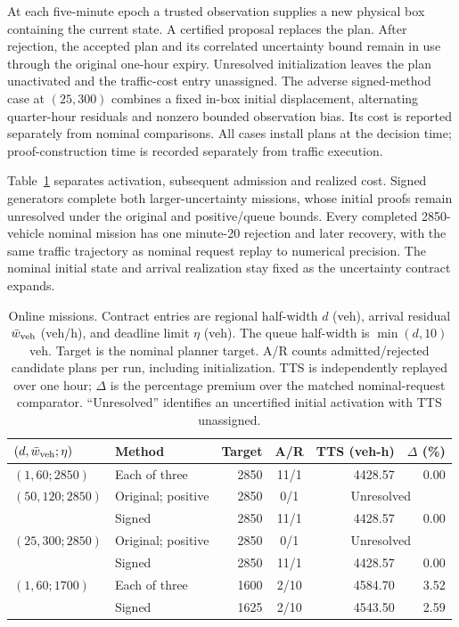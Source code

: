 \documentclass[journal,10pt]{IEEEtran}
\begin{document}
At each five-minute epoch a trusted observation supplies a new physical
box containing the current state. A certified proposal replaces the plan.
After rejection, the accepted plan
and its correlated uncertainty bound remain in use through the original
one-hour expiry. Unresolved initialization leaves the plan unactivated and
the traffic-cost entry unassigned. The adverse signed-method case at
$(25,300)$ combines a fixed in-box initial displacement, alternating
quarter-hour residuals and nonzero bounded observation bias. Its cost is
reported separately from nominal comparisons. All cases install plans at
the decision time; proof-construction time is
recorded separately from traffic execution.

Table~\ref{tab:structure-online} separates activation, subsequent admission
and realized cost. Signed generators complete both larger-uncertainty
missions, whose initial proofs remain unresolved under the original and
positive/queue bounds. Every completed 2850-vehicle nominal mission has
one minute-20 rejection and later recovery, with the same traffic trajectory
as nominal request replay to numerical precision. The nominal initial state
and arrival realization stay fixed as the
uncertainty contract expands.

\begin{table}[t]
\centering
\caption{Online missions. Contract entries are regional half-width $d$
(veh), arrival residual $\bar w_{\rm veh}$ (veh/h), and deadline limit $\eta$ (veh).
The queue half-width is $\min(d,10)$ veh. Target is the nominal planner
target. A/R counts admitted/rejected candidate plans per run, including
initialization. TTS is independently replayed over one hour; $\Delta$ is
the percentage premium over the matched nominal-request comparator.
``Unresolved'' identifies an uncertified initial activation with TTS unassigned.}
\label{tab:structure-online}
\small
\setlength{\tabcolsep}{3pt}
\begin{tabular}{@{}l l r c r r@{}}
\toprule
$(d,\bar w_{\rm veh};\eta)$ & Method & Target & A/R & TTS (veh-h) & $\Delta$ (\%)\\
\midrule
$(1,60;2850)$ & Each of three & 2850 & 11/1 & 4428.57 & 0.00\\
$(50,120;2850)$ & Original; positive & 2850 & 0/1 & \multicolumn{2}{c}{Unresolved}\\
 & Signed & 2850 & 11/1 & 4428.57 & 0.00\\
$(25,300;2850)$ & Original; positive & 2850 & 0/1 & \multicolumn{2}{c}{Unresolved}\\
 & Signed & 2850 & 11/1 & 4428.57 & 0.00\\
$(1,60;1700)$ & Each of three & 1600 & 2/10 & 4584.70 & 3.52\\
 & Signed & 1625 & 2/10 & 4543.50 & 2.59\\
\bottomrule
\end{tabular}
\end{table}
\end{document}
